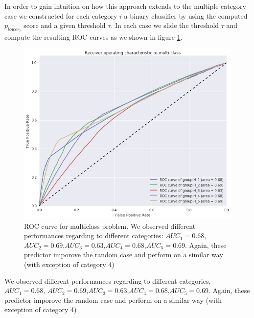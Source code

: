 In order to gain intuition on how this approach extends to the multiple category case we constructed for each category $i$ a binary classifier by using the computed $p_{lower_{i}}$ score and a given threshold $\tau$. In each case we slide the threshold $\tau$ and compute the resulting ROC curves as we shown in figure \ref{roc_multiple_categories}.

\begin{figure}
\includegraphics[width=\columnwidth]{figures/ROC_multiclass/ROC_multiclass.png}
\caption{ROC curve for multiclass problem. We observed different performances regarding to different categories: $AUC_1=0.68$, $AUC_2=0.69$,$AUC_3=0.63$,$AUC_4=0.68$,$AUC_5=0.69$. Again, these predictor imporove the random case and perform on a similar way (with exception of category 4)}
\label{roc_multiple_categories}
\end{figure}

We observed different performances regarding to different categories, $AUC_1=0.68$, $AUC_2=0.69$,$AUC_3=0.63$,$AUC_4=0.68$,$AUC_5=0.69$. Again, these predictor imporove the random case and perform on a similar way (with exception of category 4)


